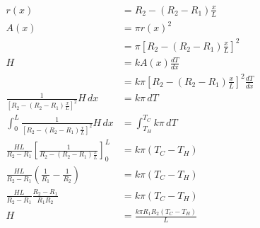 \documentclass{article}
\begin{document}
\setcounter{subsubsection}{112}
\subsubsection{}

\begin{align*}
  r(x)                                                                             & = R_2 - (R_2 - R_1) \frac{x}{L}                                        \\
  A(x)                                                                             & = \pi r(x)^2                                                           \\
                                                                                   & = \pi \left[ R_2 - (R_2 - R_1) \frac{x}{L} \right]^2                   \\
  H                                                                                & = k A(x) \frac{d T}{d x}                                               \\
                                                                                   & = k \pi \left[ R_2 - (R_2 - R_1) \frac{x}{L} \right]^2 \frac{d T}{d x} \\
  \frac{1}{\left[ R_2 - (R_2 - R_1) \frac{x}{L} \right]^2} H \,d x                 & = k \pi \,d T                                                          \\
  \int_0^L \frac{1}{\left[ R_2 - (R_2 - R_1) \frac{x}{L} \right]^2} H \,d x        & = \int_{T_H}^{T_C} k \pi \,d T                                         \\
  \frac{H L}{R_2 - R_1} \left[ \frac{1}{R_2 - (R_2 - R_1) \frac{x}{L}} \right]_0^L & = k \pi (T_C - T_H)                                                    \\
  \frac{H L}{R_2 - R_1} \left( \frac{1}{R_1} - \frac{1}{R_2} \right)               & = k \pi (T_C - T_H)                                                    \\
  \frac{H L}{R_2 - R_1} \frac{R_2 - R_1}{R_1 R_2}                                  & = k \pi (T_C - T_H)                                                    \\
  H                                                                                & = \frac{k \pi R_1 R_2 (T_C - T_H)}{L}
\end{align*}

\setcounter{subsubsection}{114}
\subsubsection{}
\end{document}
